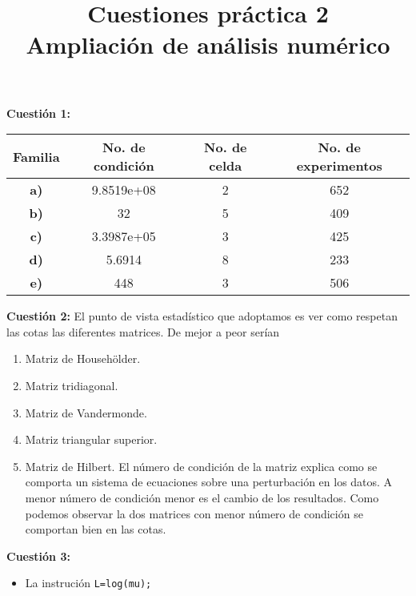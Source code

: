 \documentclass[12pt]{article}
\title{\textbf{Cuestiones práctica 2\\ {\small Ampliación de análisis numérico}}}
\date{}
\author{}
\theoremstyle{definition}
\begin{document}
\maketitle
	
\noindent\textbf{Cuestión 1:}
\begin{center}
	\begin{tabular}{|c || c | c  || c |}
		\hline
		\textbf{Familia} & \textbf{No. de condición} & \textbf{No. de celda} & \textbf{No. de experimentos} \\ 
		\hline
		\textbf{a)} & 9.8519e+08 & 2 & 652 \\
		\hline 
		\textbf{b)} & 32 & 5 & 409\\
		\hline
		\textbf{c)} & 3.3987e+05 & 3 & 425\\
		\hline 
		\textbf{d)} & 5.6914 & 8 & 233\\
		\hline
		\textbf{e)} & 448 & 3 & 506 \\
		\hline
	\end{tabular}
\end{center}
\noindent\textbf{Cuestión 2:}
El punto de vista estadístico que adoptamos es ver como respetan las cotas las diferentes matrices. De mejor a peor serían
\begin{enumerate}
	\item Matriz de Househölder.
	\item Matriz tridiagonal.
	\item Matriz de Vandermonde.
	\item Matriz triangular superior.
	\item Matriz de Hilbert.
El número de condición de la matriz explica como se comporta un sistema de ecuaciones sobre una perturbación en los datos. A menor número de condición menor es el cambio de los resultados. Como podemos observar la dos matrices con menor número de condición se comportan bien en las cotas.
\end{enumerate}
\noindent\textbf{Cuestión 3:} 
\begin{itemize}
	\item La instrución \texttt{L=log(mu);}
\end{itemize}
\end{document}
